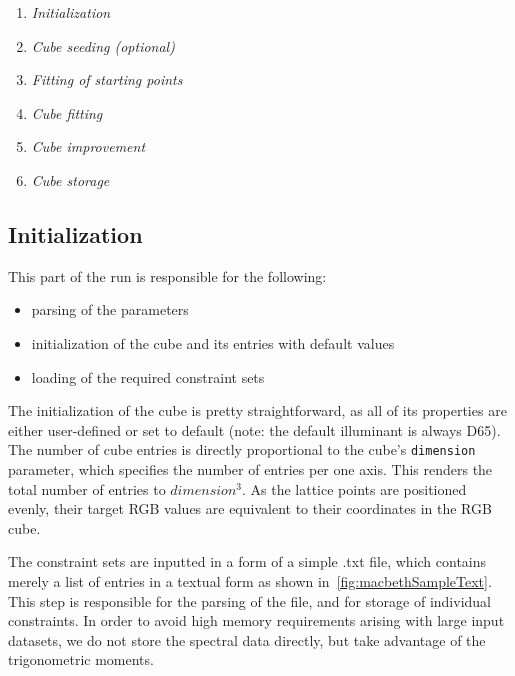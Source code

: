 \begin{enumerate}
	\item \emph{Initialization}
	\item \emph{Cube seeding (optional)}
	\item \emph{Fitting of starting points}
	\item \emph{Cube fitting}
	\item \emph{Cube improvement}
	\item \emph{Cube storage}
\end{enumerate}

\subsection{Initialization} \label{ssec:initialization}

This part of the run is responsible for the following:
\begin{itemize}
	\item parsing of the parameters
	\item initialization of the cube and its entries with default values
	\item loading of the required constraint sets
\end{itemize}

The initialization of the cube is pretty straightforward, as all of its properties are either user-defined or set to default (note: the default illuminant is always D65). The number of cube entries is directly proportional to the cube's \texttt{dimension} parameter, which specifies the number of entries per one axis. This renders the total number of entries to $dimension^3$. As the lattice points are positioned evenly, their target RGB values are equivalent to their coordinates in the RGB cube.

The constraint sets are inputted in a form of a simple .txt file, which contains merely a list of entries in a textual form as shown in~\cref{fig:macbethSampleText}. This step is responsible for the parsing of the file, and for storage of individual constraints. In order to avoid high memory requirements arising with large input datasets, we do not store the spectral data directly, but take advantage of the trigonometric moments.

